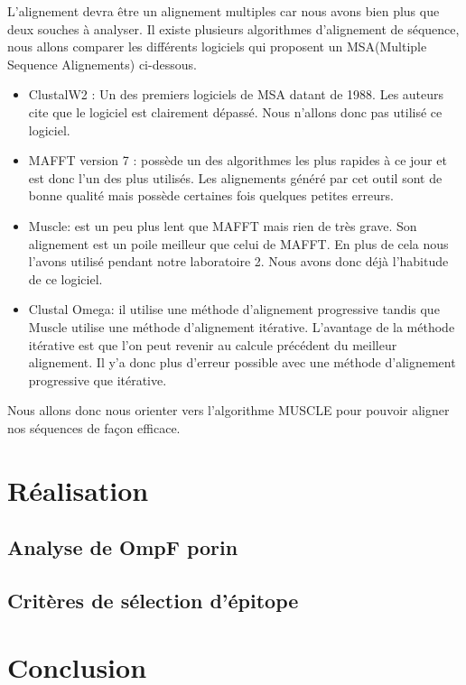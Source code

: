 \documentclass{article}
\begin{document}
     L'alignement devra être un alignement multiples car nous avons bien plus que deux souches à analyser. Il existe plusieurs algorithmes d'alignement de séquence, nous allons comparer les différents logiciels qui proposent un MSA(Multiple Sequence Alignements) ci-dessous.
   
    \begin{itemize}
      \item ClustalW2 : Un des premiers logiciels de MSA datant de 1988. Les auteurs cite que le logiciel est clairement dépassé. Nous n'allons donc pas utilisé ce logiciel. 
      \item MAFFT version 7 : possède un des algorithmes les plus rapides à ce jour et est donc l'un des plus utilisés. Les alignements généré par cet outil sont de bonne qualité mais possède certaines fois quelques petites erreurs.
      \item Muscle: est un peu plus lent que MAFFT mais rien de très grave. Son alignement est un poile meilleur que celui de MAFFT. En plus de cela nous l'avons utilisé pendant notre laboratoire 2. Nous avons donc déjà l'habitude de ce logiciel. 
      \item Clustal Omega: il utilise une méthode d'alignement progressive tandis que Muscle utilise une méthode d'alignement itérative. L'avantage de la méthode itérative est que l'on peut revenir au calcule précédent du meilleur alignement. Il y'a donc plus d'erreur possible avec une méthode d'alignement progressive que itérative.
    \end{itemize}

    Nous allons donc nous orienter vers l'algorithme MUSCLE pour pouvoir aligner nos séquences de façon efficace.

  \section{Réalisation}
  
    \subsection{Analyse de OmpF porin}
    
    \subsection{Critères de sélection d'épitope}
  
  \section{Conclusion}
\end{document}
